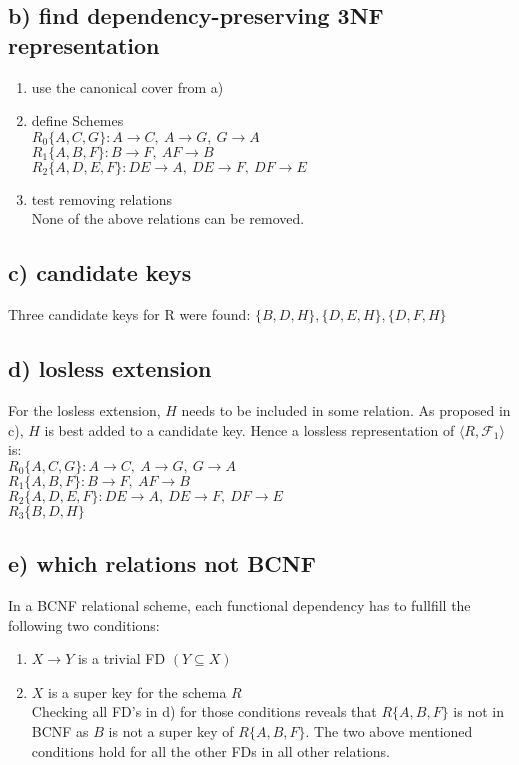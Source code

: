 \documentclass[a4paper,11pt,twoside]{article}
\newcommand{\fdep}[2]{{\mathit{#1}} \rightarrow {\mathit{#2}}}
\begin{document}
\subsection*{b) find dependency-preserving 3NF representation}
\begin{enumerate}
\item use the canonical cover from a)
\item define Schemes\\
  $R_0\{A, C, G\}: \fdep{A}{C},\ \fdep{A}{G},\ \fdep{G}{A}$\\
  $R_1\{A, B, F\}: \fdep{B}{F},\ \fdep{AF}{B}$\\
  $R_2\{A, D, E, F\}: \fdep{DE}{A},\ \fdep{DE}{F},\ \fdep{DF}{E}$\\
  
\item test removing relations\\
None of the above relations can be removed. 
\end{enumerate}

\subsection*{c) candidate keys}
Three candidate keys for R were found: $\{B,D,H\}, \{D,E,H\}, \{D,F,H\}$

\subsection*{d) losless extension}
For the losless extension, $H$ needs to be included in some relation. As proposed in c), $H$ is best added to a candidate key. Hence a lossless representation of $\langle R,\mathcal{F}_1 \rangle$ is: \\
$R_0\{A, C, G\}: \fdep{A}{C},\ \fdep{A}{G},\ \fdep{G}{A}$\\
$R_1\{A, B, F\}: \fdep{B}{F},\ \fdep{AF}{B}$\\
$R_2\{A, D, E, F\}: \fdep{DE}{A},\ \fdep{DE}{F},\ \fdep{DF}{E}$\\
$R_3\{B, D, H\}$\\


\subsection*{e) which relations not BCNF}
In a BCNF relational scheme, each functional dependency has to fullfill the following two conditions:
\begin{enumerate}
\item $\fdep{X}{Y}$ is a trivial FD $(Y \subseteq X)$
\item $X$ is a super key for the schema $R$\\
Checking all FD's in d) for those conditions reveals that $R\{A,B,F\}$ is not in BCNF as $B$ is not a super key of $R\{A,B,F\}$. The two above mentioned conditions hold for all the other FDs in all other relations. 

\end{enumerate}
\end{document}
